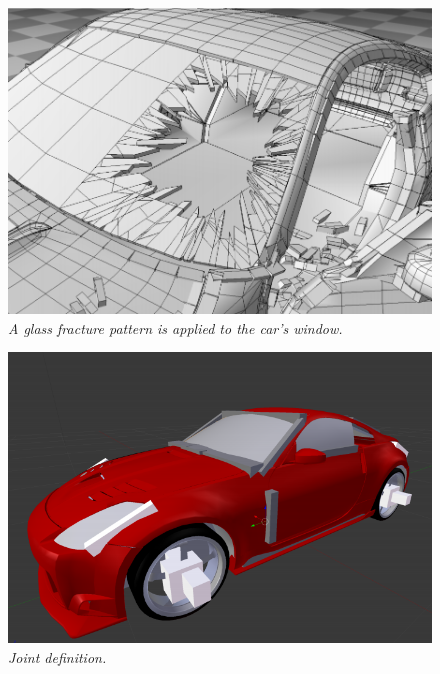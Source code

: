 \documentclass[
	11pt, 
	DIV10,
	a4paper, 
	oneside, 
	headings=normal, 
	captions=tableheading,
	final, 
	numbers=noenddot
]{scrartcl}
\begin{document}
	\begin{minipage}{0.5\textwidth}
		\begin{figure}[H]
			\centering
			\includegraphics[scale = 0.26]{GlassFracture.PNG}
			\caption[caption]{\label{GlassFracture} \textit{A glass fracture pattern is applied to the car's window.}\footnotemark[1]}
		\end{figure}
	\end{minipage}
	\begin{minipage}{0.5\textwidth}
		\begin{figure}[H]
			\centering
			\includegraphics[scale = 0.34]{Joints.PNG}
			\caption[caption]{\label{Joints} \textit{Joint definition.} \footnotemark[1]}
		\end{figure}
	\end{minipage}
\end{document}
